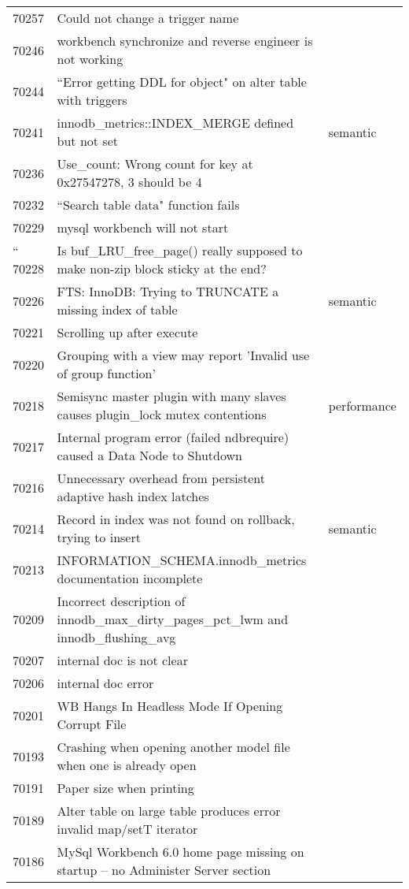 \begin{longtable}[c]{p{1cm}p{10cm}p{1cm}}
70257 & Could not change a trigger name &  \\
70246 & workbench synchronize and reverse engineer is not working &  \\
70244 & ``Error getting DDL for object" on alter table with triggers &  \\
70241 & innodb\_metrics::INDEX\_MERGE defined but not set & semantic \\
70236 & Use\_count: Wrong count for key at 0x27547278, 3 should be 4 &  \\
70232 & ``Search table data" function fails &  \\
70229 & mysql workbench will not start &  \\``
70228 & Is buf\_LRU\_free\_page() really supposed to make non-zip block sticky at the end? &  \\
70226 & FTS: InnoDB: Trying to TRUNCATE a missing index of table & semantic \\
70221 & Scrolling up after execute &  \\
70220 & Grouping with a view may report 'Invalid use of group function' &  \\
70218 & Semisync master plugin with many slaves causes plugin\_lock mutex contentions & performance \\
70217 & Internal program error (failed ndbrequire) caused a Data Node to Shutdown &  \\
70216 & Unnecessary overhead from persistent adaptive hash index latches &  \\
70214 & Record in index was not found on rollback, trying to insert & semantic \\
70213 & INFORMATION\_SCHEMA.innodb\_metrics documentation incomplete &  \\
70209 & Incorrect description of innodb\_max\_dirty\_pages\_pct\_lwm and innodb\_flushing\_avg &  \\
70207 & internal doc is not clear &  \\
70206 & internal doc error &  \\
70201 & WB Hangs In Headless Mode If Opening Corrupt File &  \\
70193 & Crashing when opening another model file when one is already open &  \\
70191 & Paper size when printing &  \\
70189 & Alter table on large table produces error invalid map/setT iterator &  \\
70186 & MySql Workbench 6.0 home page missing on startup -- no Administer Server section &  \\

\end{longtable}
